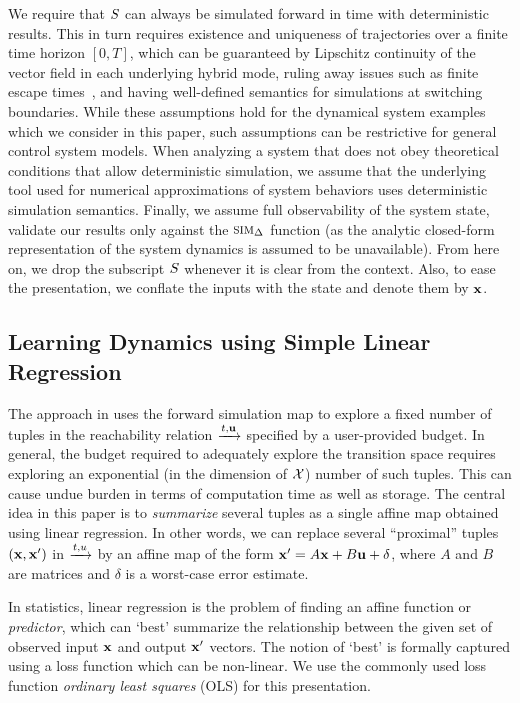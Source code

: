  We require that $S$ can always be
simulated forward in time with deterministic results. This in turn
requires existence and uniqueness of trajectories over a finite time
horizon $[0,T]$, which can be guaranteed by Lipschitz continuity of
the vector field in each underlying hybrid mode, ruling away issues
such as finite escape times~\cite{Meiss/2007/Differential}, and having
well-defined semantics for simulations at switching boundaries. While
these assumptions hold for the dynamical system examples which we
consider in this paper, such assumptions can be restrictive for
general control system models. When analyzing a system that does not
obey theoretical conditions that allow deterministic simulation, we
assume that the underlying tool used for numerical approximations of
system behaviors uses deterministic simulation semantics.  Finally, we
assume full observability of the system state, validate our results
only against the $\mbox{\sc sim}_\Delta$ function (as the analytic closed-form
representation of the system dynamics is assumed to be unavailable).
From here on, we drop the subscript $S$ whenever it is clear
from the context. Also, to ease the presentation, we conflate the
inputs with the state and denote them by $\mathbf{x}$.

\subsection{Learning Dynamics using Simple Linear Regression}

The approach in \cite{zutshi2014multiple} uses the forward simulation
map to explore a fixed number of tuples in the reachability relation
$\xrightarrow{t,\mathbf{u}}$ specified by a user-provided budget.  In general, the
budget required to adequately explore the transition space requires
exploring an exponential (in the dimension of $\mathcal{X}$) number
of such tuples. This can cause undue burden in terms of computation
time as well as storage.  The central idea in this paper is to {\em
summarize} several tuples as a single affine map obtained using linear
regression.  In other words, we can replace several ``proximal''
tuples $(\mathbf{x},\mathbf{x}')$ in $\xrightarrow{t,u}$ by an affine map of the form
$\mathbf{x}' = A\mathbf{x} + B\mathbf{u} + \delta$, where $A$ and $B$ are matrices and
$\delta$ is a worst-case error estimate.

In statistics, linear regression is the problem of finding an affine
function or \textit{predictor}, which can `best' summarize the
relationship between the given set of observed input $\mathbf{x}$ and output
$\mathbf{x}'$ vectors. The notion of `best' is formally captured using a loss
function which can be non-linear. We use the commonly used loss
function \textit{ordinary least squares} (OLS) for this presentation.


